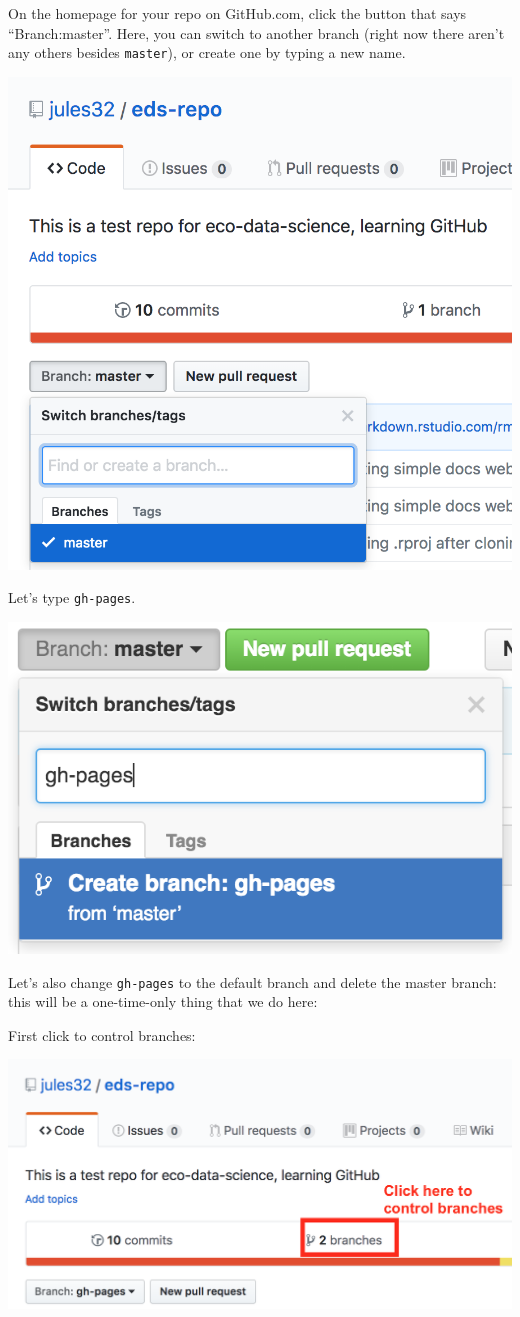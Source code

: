\documentclass[]{book}
\begin{document}
On the homepage for your repo on GitHub.com, click the button that says ``Branch:master''. Here, you can switch to another branch (right now there aren't any others besides \texttt{master}), or create one by typing a new name.

\includegraphics[width=0.8\linewidth]{img/github-branch}

Let's type \texttt{gh-pages}.

\includegraphics[width=0.8\linewidth]{img/github_create-branch_gh-pages}

Let's also change \texttt{gh-pages} to the default branch and delete the master branch: this will be a one-time-only thing that we do here:

First click to control branches:

\includegraphics[width=0.8\linewidth]{img/github-branch2}
\end{document}
